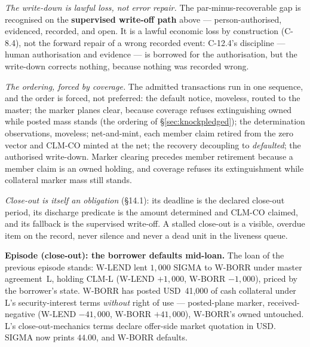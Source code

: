 \documentclass[11pt,a4paper]{article}
\newcommand{\USD}[1]{\mbox{USD~#1}}
\begin{document}
\emph{The write-down is lawful loss, not error repair.} The par-minus-recoverable gap is
recognised on the \textbf{supervised write-off path} above --- person-authorised, evidenced,
recorded, and open. It is a lawful economic loss by construction (C-8.4), not the forward
repair of a wrong recorded event: C-12.4's discipline --- human authorisation and evidence
--- is borrowed for the authorisation, but the write-down corrects nothing, because nothing
was recorded wrong.

\emph{The ordering, forced by coverage.} The admitted transactions run in one sequence, and
the order is forced, not preferred: the default notice, moveless, routed to the master; the
marker planes clear, because coverage refuses extinguishing owned while posted mass stands
(the ordering of \S\ref{sec:knockpledged}); the determination observations, moveless;
net-and-mint, each member claim retired from the zero vector and CLM-CO minted at the net;
the recovery decoupling to \emph{defaulted}; the authorised write-down. Marker clearing
precedes member retirement because a member claim is an owned holding, and coverage refuses
its extinguishment while collateral marker mass still stands.

\emph{Close-out is itself an obligation} (\S14.1): its deadline is the declared close-out
period, its discharge predicate is the amount determined and CLM-CO claimed, and its fallback
is the supervised write-off. A stalled close-out is a visible, overdue item on the record,
never silence and never a dead unit in the liveness queue.

\medskip\noindent\textbf{Episode (close-out): the borrower defaults mid-loan.}
The loan of the previous episode stands: W-LEND lent $1{,}000$ SIGMA to W-BORR under master
agreement~L, holding CLM-L (W-LEND $+1{,}000$, W-BORR $-1{,}000$), priced by the borrower's
state. W-BORR has posted \USD{41,000} of cash collateral under L's security-interest terms
\emph{without} right of use --- posted-plane marker, received-negative (W-LEND $-41{,}000$,
W-BORR $+41{,}000$), W-BORR's owned untouched. L's close-out-mechanics terms declare
offer-side market quotation in USD. SIGMA now prints $44.00$, and W-BORR defaults.
\end{document}
